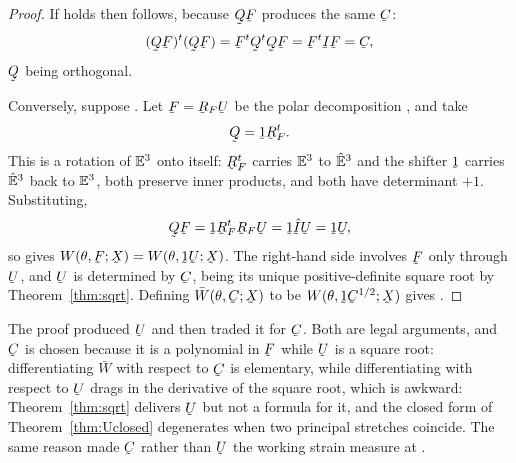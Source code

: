 \begin{proof}
If  holds then  follows, because $\bQ\bF$ produces
the same $\bC$:
\[
   (\bQ\bF)^{t}(\bQ\bF)=\bF^{t}\bQ^{t}\bQ\bF=\bF^{t}\I\bF=\bC ,
\]
$\bQ$ being orthogonal.

Conversely, suppose . Let $\bF=\bR_{F}\bU$ be the polar
decomposition , and take
\[
   \bQ=\shift\bR^{t}_{F} .
\]
This is a rotation of $\mathbb{E}^{3}$ onto itself: $\bR^{t}_{F}$ carries $\mathbb{E}^{3}$ to
$\hat{\mathbb{E}}^{3}$ and the shifter $\shift$ carries $\hat{\mathbb{E}}^{3}$ back to $\mathbb{E}^{3}$, both
preserve inner products, and both have determinant $+1$. Substituting,
\[
   \bQ\bF=\shift\bR^{t}_{F}\bR_{F}\bU=\shift\hI\bU=\shift\bU ,
\]
so  gives $W(\theta,\bF;\bX)=W(\theta,\shift\bU;\bX)$. The
right-hand side involves $\bF$ only through $\bU$, and $\bU$ is
determined by $\bC$, being its unique positive-definite square root by
Theorem~\ref{thm:sqrt}. Defining $\bar W(\theta,\bC;\bX)$ to be
$W(\theta,\shift\bC^{1/2};\bX)$ gives .
\end{proof}

\begin{remark}\label{rem:ch11whyC}
The proof produced $\bU$ and then traded it for $\bC$. Both are legal
arguments, and $\bC$ is chosen because it is a polynomial in $\bF$ while
$\bU$ is a square root: differentiating $\bar W$ with respect to $\bC$
is elementary, while differentiating with respect to $\bU$ drags in the
derivative of the square root, which is awkward: Theorem~\ref{thm:sqrt}
delivers $\bU$ but not a formula for it, and the closed form of
Theorem~\ref{thm:Uclosed} degenerates when two principal stretches
coincide. The same reason
made $\bC$ rather than $\bU$ the working strain measure at .
\end{remark}

